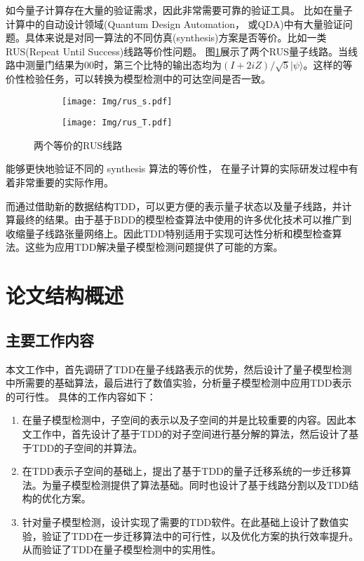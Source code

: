 如今量子计算存在大量的验证需求，因此非常需要可靠的验证工具。
比如在量子计算中的自动设计领域(Quantum Design Automation， 或QDA)中有大量验证问题。具体来说是对同一算法的不同仿真(synthesis)方案是否等价。比如一类RUS(Repeat Until Success)线路等价性问题。
图\ref{fig:rus-equal}展示了两个RUS量子线路。当线路中测量门结果为$00$时，第三个比特的输出态均为$\left(I+2iZ\right)/ \sqrt 5 |\psi\rangle$。这样的等价性检验任务，可以转换为模型检测中的可达空间是否一致。
\begin{figure}[!htbp]
	\centering
	\begin{subfigure}[b]{0.45\textwidth}
        \centering
        \texttt{[image: Img/rus\_s.pdf]}
	\end{subfigure}
	\qquad
	\begin{subfigure}[b]{0.45\textwidth}
        \centering
        \texttt{[image: Img/rus\_T.pdf]}
	\end{subfigure}
	\caption{两个等价的RUS线路\citep{Bocharov_2015}}
	\label{fig:rus-equal}
\end{figure}
能够更快地验证不同的 synthesis 算法的等价性，
在量子计算的实际研发过程中有着非常重要的实际作用。

而通过借助新的数据结构TDD，可以更方便的表示量子状态以及量子线路，并计算最终的结果。由于基于BDD的模型检查算法中使用的许多优化技术可以推广到收缩量子线路张量网络上\citep{Chaki_2018}。因此TDD特别适用于实现可达性分析和模型检查算法。这些为应用TDD解决量子模型检测问题提供了可能的方案。
\section{论文结构概述}

\subsection*{主要工作内容}
本文工作中，首先调研了TDD在量子线路表示的优势，然后设计了量子模型检测中所需要的基础算法，最后进行了数值实验，分析量子模型检测中应用TDD表示的可行性。
具体的工作内容如下：
\begin{enumerate}
    \item 在量子模型检测中，子空间的表示以及子空间的并是比较重要的内容。因此本文工作中，首先设计了基于TDD的对子空间进行基分解的算法，然后设计了基于TDD的子空间的并算法。
    \item 
    在TDD表示子空间的基础上，提出了基于TDD的量子迁移系统的一步迁移算法。为量子模型检测提供了算法基础。同时也设计了基于线路分割以及TDD结构的优化方案。
    \item 针对量子模型检测，设计实现了需要的TDD软件。在此基础上设计了数值实验，验证了TDD在一步迁移算法中的可行性，以及优化方案的执行效率提升。从而验证了TDD在量子模型检测中的实用性。
\end{enumerate}

